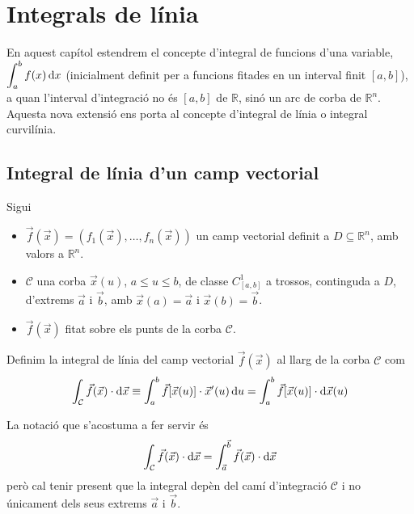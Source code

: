 \section{Integrals de línia}
En aquest capítol estendrem el concepte d'integral de funcions d'una variable, $\displaystyle \int_{a}^{b} f(x) \mathop{}\!\mathrm{d} x$ (inicialment definit per a funcions fitades en un interval finit $[a,b]$), a quan l'interval d'integració no és $[a,b]$ de $\mathbb{R}$, sinó un arc de corba de $\mathbb{R}^{n}$. Aquesta nova extensió ens porta al concepte d'integral de línia o integral curvilínia.

\subsection{Integral de línia d'un camp vectorial}
Sigui
\begin{itemize}
    \item $\vec{f}(\vec{x}) = (f_{1}(\vec{x}), \dots, f_{n}(\vec{x}))$ un camp vectorial definit a $D \subseteq \mathbb{R}^{n}$, amb valors a $\mathbb{R}^{n}$.
    \item $\mathcal{C}$ una corba $\vec{x}(u)$, $a\leq u \leq b$, de classe $C^{1}_{[a,b]}$ a trossos, continguda a $D$, d'extrems $\vec{a}$ i $\vec{b}$, amb $\vec{x}(a) = \vec{a}$ i $\vec{x}(b) = \vec{b}$.
    \item $\vec{f}(\vec{x})$ fitat sobre els punts de la corba $\mathcal{C}$.
\end{itemize}
\begin{defi}
    Definim la integral de línia del camp vectorial $\vec{f}(\vec{x})$ al llarg de la corba $\mathcal{C}$ com
    \begin{align}
        \int_{\mathcal{C}} \vec{f}(\vec{x}) \cdot \mathrm{d} \vec{x} \equiv \int_{a}^{b} \vec{f}[\vec{x}(u)] \cdot \vec{x}'(u) \mathop{}\!\mathrm{d} u = \int_{a}^{b} \vec{f}[\vec{x}(u)] \cdot \mathrm{d} \vec{x}(u)
    \end{align}
\end{defi}
La notació que s'acostuma a fer servir és 
\begin{align}
    \int_\mathcal{C} \vec{f}(\vec{x}) \cdot \mathrm{d} \vec{x} = \int_{\vec{a}}^{\vec{b}} \vec{f}(\vec{x}) \cdot \mathrm{d} \vec{x}
\end{align}
però cal tenir present que la integral depèn del camí d'integració $\mathcal{C}$ i no únicament dels seus extrems $\vec{a}$ i $\vec{b}$.

